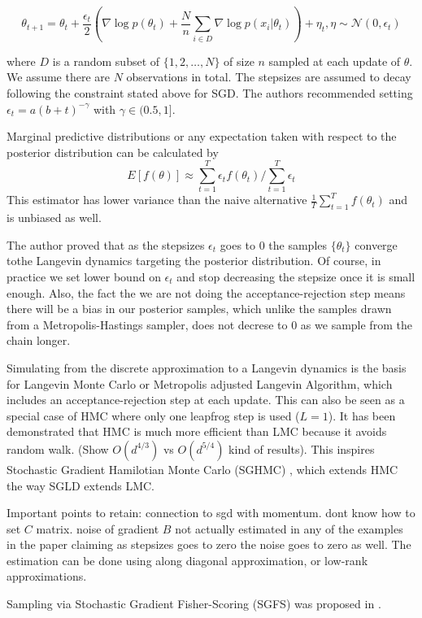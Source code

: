 \documentclass{book}
\begin{document}
\begin{enumerate}
\[\theta_{t+1} = \theta_t + \frac{\epsilon_t}{2} ( \nabla \log p(\theta_t) + \frac{N}{n} \sum_{i \in D} \nabla \log p(x_i|\theta_t) ) + \eta_t , \eta \sim \mathcal{N}(0,\epsilon_t) \]

where $D$ is a random subset of $\{1,2, \dots, N\}$ of size $n$ sampled at each update of $\theta$. We assume there are $N$ observations in total. The stepsizes are assumed to decay following the constraint stated above for SGD. The authors recommended setting $\epsilon_t = a(b+t)^{-\gamma} $ with $\gamma \in (0.5,1]$.  

Marginal predictive distributions or any expectation taken with respect to the posterior distribution can be calculated by 
\[ E[f(\theta)] \approx \sum_{t=1}^T \epsilon_t f(\theta_t) / \sum_{t=1}^T \epsilon_t \] 
This estimator has lower variance than the naive alternative $\frac{1}{T} \sum_{t=1}^T f(\theta_t) $ and is unbiased as well. 

The author proved that as the stepsizes $\epsilon_t$ goes to $0$ the samples $\{\theta_t\}$ converge tothe Langevin dynamics targeting the posterior distribution. Of course, in practice we set lower bound on $\epsilon_t$ and stop decreasing the stepsize once it is small enough. Also, the fact the we are not doing the acceptance-rejection step means there will be a bias in our posterior samples, which unlike the samples drawn from a Metropolis-Hastings sampler, does not decrese to $0$ as we sample from the chain longer.

Simulating from the discrete approximation to a Langevin dynamics is the basis
for Langevin Monte Carlo or Metropolis adjusted Langevin Algorithm, which
includes an acceptance-rejection step at each update. This can also be seen as a
special case of HMC where only one leapfrog step is used ($L=1$). It has been
demonstrated that HMC is much more efficient than LMC because it avoids random
walk. (Show $O(d^{4/3})$ vs $O(d^{5/4})$ kind of results). This inspires
Stochastic Gradient Hamilotian Monte Carlo (SGHMC) \cite{chen2014stochastic},
which extends HMC the way SGLD extends LMC. 

Important points to retain: connection to sgd with momentum. dont know how to
set $C$ matrix. noise of gradient $B$ not actually estimated in any of the
examples in the paper claiming as stepsizes goes to zero the noise goes to zero
as well. The estimation can be done using along diagonal approximation, or  
low-rank approximations. 

Sampling via Stochastic Gradient Fisher-Scoring (SGFS) was proposed in
\cite{ahn2012bayesian}.



\end{enumerate}
\end{document}
